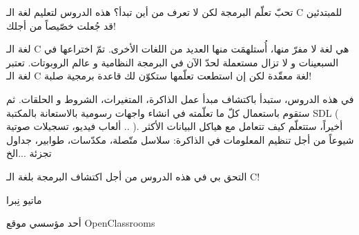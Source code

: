 \newpage
تحبّ تعلّم البرمجة لكن لا تعرف من أين تبدأ؟ هذه الدروس لتعليم لغة الـ
\textenglish{C}
للمبتدئين قد جُعلت خصّيصاً من أجلك!

لغة الـ
\textenglish{C}
هي لغة لا مفرّ منها، أُستلهمَت منها العديد من اللغات الأخرى. تمّ اختراعها في السبعينات و لا تزال مستعملة لحدّ الآن في البرمجة النظامية و عالم الروبوتات. تعتبر لغة الـ
\textenglish{C}
لغة معقّدة لكن إن استطعت تعلّمها ستكوّن لك قاعدة برمجية صلبة!

في هذه الدروس، ستبدأ باكتشاف مبدأ عمل الذاكرة، المتغيرات، الشروط و الحلقات. ثم ستقوم باستعمال كلّ ما تعلّمته في انشاء واجهات رسومية بالاستعانة بالمكتبة
\textenglish{SDL}
 ( ألعاب فيديو، تسجيلات صوتية .. ). أخيراً، ستتعلّم كيف تتعامل مع هياكل البيانات الأكثر شيوعاً من أجل تنظيم المعلومات في الذاكرة: سلاسل متّصلة، مكدّسات، طوابير، جداول تجزئة ...الخ

التحق بي في هذه الدروس من أجل اكتشاف البرمجة بلغة الـ
\textenglish{C}!


\vspace{3em}
\hfill ماتيو نِبرا

\hfill أحد مؤسسي موقع \textenglish{OpenClassrooms}
